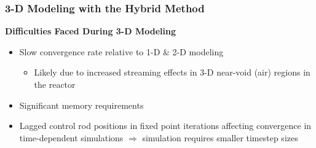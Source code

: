 \begin{frame}
  \frametitle{3-D Modeling with the Hybrid Method}
  \begin{block}{\textbf{Difficulties Faced During 3-D Modeling}}
  \begin{itemize}
    \item Slow convergence rate relative to 1-D \& 2-D modeling
    \begin{itemize}
      \item Likely due to increased streaming effects in 3-D near-void (air) regions in the reactor
    \end{itemize}
    \item Significant memory requirements
    \item Lagged control rod positions in fixed point iterations affecting convergence in time-dependent
      simulations $\Rightarrow$ simulation requires smaller timestep sizes
  \end{itemize}
\end{block}
\end{frame}
